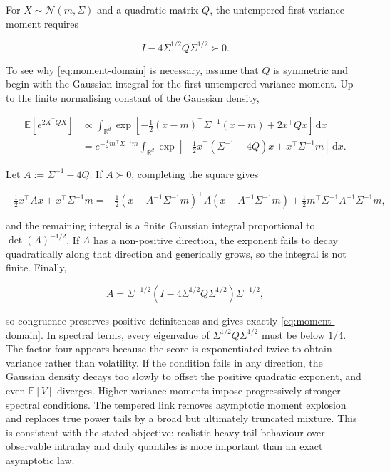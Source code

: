 \documentclass[11pt,a4paper]{article}
\newcommand{\E}{\mathbb{E}}
\newcommand{\R}{\mathbb{R}}
\newcommand{\dd}{\,\mathrm{d}}
\begin{document}
For \(X\sim\mathcal N(m,\Sigma)\) and a quadratic matrix \(Q\), the untempered first variance
moment requires

\begin{equation}
I-4\Sigma^{1/2}Q\Sigma^{1/2}\succ0.
\label{eq:moment-domain}
\end{equation}

To see why \cref{eq:moment-domain} is necessary, assume that \(Q\) is symmetric and begin with
the Gaussian integral for the first untempered variance moment. Up to the finite normalising
constant of the Gaussian density,

\begin{equation*}
\begin{split}
\E[e^{2X^\top QX}]
&\propto\int_{\R^d}
\exp\!\left[-\tfrac12(x-m)^\top\Sigma^{-1}(x-m)+2x^\top Qx\right]\dd x\\
&=e^{-\frac12m^\top\Sigma^{-1}m}
\int_{\R^d}\exp\!\left[-\tfrac12x^\top(\Sigma^{-1}-4Q)x
+x^\top\Sigma^{-1}m\right]\dd x.
\end{split}
\end{equation*}

Let \(A:=\Sigma^{-1}-4Q\). If \(A\succ0\), completing the square gives

\begin{equation*}
-\tfrac12x^\top Ax+x^\top\Sigma^{-1}m
=-\tfrac12(x-A^{-1}\Sigma^{-1}m)^\top
A(x-A^{-1}\Sigma^{-1}m)
+\tfrac12m^\top\Sigma^{-1}A^{-1}\Sigma^{-1}m,
\end{equation*}

and the remaining integral is a finite Gaussian integral proportional to
\(\det(A)^{-1/2}\). If \(A\) has a non-positive direction, the exponent fails to decay
quadratically along that direction and generically grows, so the integral is not finite.
Finally,

\begin{equation*}
A=\Sigma^{-1/2}
\left(I-4\Sigma^{1/2}Q\Sigma^{1/2}\right)\Sigma^{-1/2},
\end{equation*}

so congruence preserves positive definiteness and gives exactly
\cref{eq:moment-domain}. In spectral terms, every eigenvalue of
\(\Sigma^{1/2}Q\Sigma^{1/2}\) must be below \(1/4\).  The factor four appears because the score
is exponentiated twice to obtain variance rather than volatility.  If the condition fails in
any direction, the Gaussian density decays too slowly to offset the positive quadratic
exponent, and even \(\E[V]\) diverges.  Higher variance moments impose progressively stronger
spectral conditions. The tempered link
removes asymptotic moment explosion and replaces true power tails by a broad but ultimately
truncated mixture. This is consistent with the stated objective: realistic heavy-tail
behaviour over observable intraday and daily quantiles is more important than an exact
asymptotic law.
\end{document}
